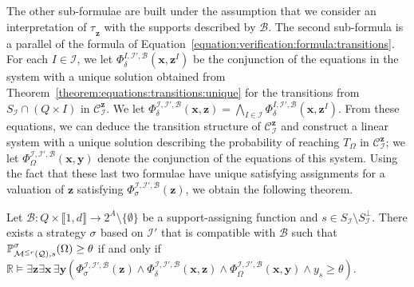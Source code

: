 \documentclass[a4paper,UKenglish,cleveref,autoref,thm-restate,colorlinks]{lipics-v2021}
\newcommand{\integerInterval}[1]{\llbracket{}#1\rrbracket{}}
\newcommand{\IR}{\mathbb{R}}
\newcommand{\subsets}[1]{2^{#1}}
\newcommand{\mdp}{\mathcal{M}}
\newcommand{\mdpStateSpace}{S}
\newcommand{\ocmdp}{\mathcal{Q}}
\newcommand{\ocmdpFin}[2]{\mdp^{\leq #2}(#1)}
\newcommand{\ocStateSpace}{Q}
\newcommand{\ocConfig}{s}
\newcommand{\ocActionSpace}{A}
\newcommand{\ocTrans}{\delta}
\newcommand{\counterUB}{r}
\newcommand{\mchain}{\mathcal{C}}
\newcommand{\intPart}{\mathcal{I}}
\newcommand{\interval}{I}
\newcommand{\intNum}{d}
\newcommand{\compressChainStrat}[1]{\mchain^{#1}_{\intPart}}
\newcommand{\compressChainStateSpace}{\mdpStateSpace_{\intPart}}
\newcommand{\compressChainStateSpaceStar}{\mdpStateSpace_{\intPart}^{\bot}}
\newcommand{\varTrans}{x}
\newcommand{\varTransTuple}{\mathbf{\varTrans}}
\newcommand{\varObj}{y}
\newcommand{\varObjTuple}{\mathbf{\varObj}}
\newcommand{\varStrat}{z}
\newcommand{\varStratI}{\mathbf{\varStrat}^{\interval}}
\newcommand{\varStratTuple}{\mathbf{\varStrat}}
\newcommand{\compressChainSymbolic}{\compressChainStrat{\varStratTuple}}
\newcommand{\formulaTransBase}{\Phi_{\ocTrans}}
\newcommand{\formulaObjBase}{\Phi_{\objective}}
\newcommand{\formulaStratBase}{\Phi_{\strat}}
\newcommand{\suppBounded}{\mathcal{B}}
\newcommand{\formulaStratB}{\formulaStratBase^{\intPart,\intPart',\suppBounded}}
\newcommand{\formulaTransB}{\formulaTransBase^{\intPart,\intPart',\suppBounded}}
\newcommand{\formulaTransBI}{\formulaTransBase^{\interval,\intPart', \suppBounded}}
\newcommand{\formulaObjB}{\formulaObjBase^{\intPart,\intPart',\suppBounded}}
\newcommand{\objective}{\Omega}
\newcommand{\target}{T}
\newcommand{\thresProba}{\theta}
\newcommand{\stratGeneric}[1]{{\sigma_{#1}}}
\newcommand{\strat}{\stratGeneric{}}
\newcommand{\stratBGeneric}[1]{{\tau_{#1}}}
\newcommand{\stratB}{\stratBGeneric{}}
\begin{document}
The other sub-formulae are built under the assumption that we consider an interpretation of $\stratB_{\varStratTuple}$ with the supports described by $\suppBounded$.
The second sub-formula is a parallel of the formula of Equation~\eqref{equation:verification:formula:transitions}.
For each $\interval\in\intPart$, we let $\formulaTransBI(\varTransTuple, \varStratI)$ be the conjunction of the equations in the system with a unique solution obtained from Theorem~\ref{theorem:equations:transitions:unique} for the transitions from $\compressChainStateSpace\cap(\ocStateSpace\times\interval)$ in $\compressChainSymbolic$.
We let $\formulaTransB(\varTransTuple, \varStratTuple) = \bigwedge_{\interval\in\intPart}\formulaTransBI(\varTransTuple, \varStratI)$.
From these equations, we can deduce the transition structure of $\compressChainSymbolic$ and construct a linear system with a unique solution describing the probability of reaching $\target_\objective$ in $\compressChainSymbolic$; we let $\formulaObjB(\varTransTuple, \varObjTuple)$ denote the conjunction of the equations of this system.
Using the fact that these last two formulae have unique satisfying assignments for a valuation of $\varStratTuple$ satisfying $\formulaStratB(\varStratTuple)$, we obtain the following theorem.
\begin{theorem}\label{theorem:synthesis:bounded:formula}
  Let $\suppBounded\colon\ocStateSpace\times\integerInterval{1, \intNum}\to\subsets{\ocActionSpace}\setminus\{\emptyset\}$ be a support-assigning function and $\ocConfig\in\compressChainStateSpace\setminus\compressChainStateSpaceStar$.
  There exists a strategy $\strat$ based on $\intPart'$ that is compatible with $\suppBounded$ such that $\probaGverb{\ocmdpFin{\ocmdp}{\counterUB}}{\ocConfig}{\strat}(\objective) \geq\thresProba$ if and only if $\IR\models\exists\varStratTuple\exists\varTransTuple\,\exists\varObjTuple (\formulaStratB(\varStratTuple)\land\formulaTransB(\varTransTuple,\varStratTuple)\land\formulaObjB(\varTransTuple, \varObjTuple)\land \varObj_\ocConfig\geq\thresProba)$.
\end{theorem}
\end{document}

